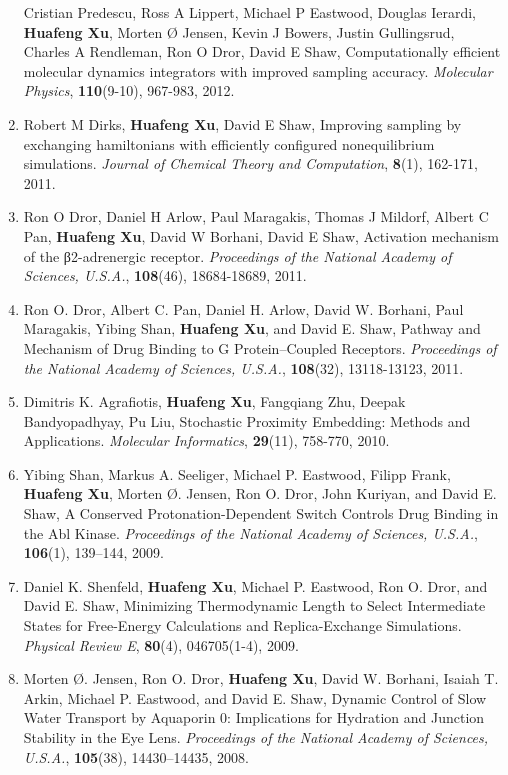 \documentclass[11pt]{article}
\begin{document}
\begin{enumerate}
Cristian Predescu, Ross A Lippert, Michael P Eastwood, Douglas Ierardi, \textbf{Huafeng Xu}, Morten Ø Jensen, Kevin J Bowers, Justin Gullingsrud, Charles A Rendleman, Ron O Dror, David E Shaw, Computationally efficient molecular dynamics integrators with improved sampling accuracy. \textit{Molecular Physics}, \textbf{110}(9-10), 967-983, 2012.
\item
Robert M Dirks, \textbf{Huafeng Xu}, David E Shaw, Improving sampling by exchanging hamiltonians with efficiently configured nonequilibrium simulations. \textit{Journal of Chemical Theory and Computation}, \textbf{8}(1), 162-171, 2011.
\item
Ron O Dror, Daniel H Arlow, Paul Maragakis, Thomas J Mildorf, Albert C Pan, \textbf{Huafeng Xu}, David W Borhani, David E Shaw, Activation mechanism of the β2-adrenergic receptor. \textit{Proceedings of the National Academy of Sciences, U.S.A.}, \textbf{108}(46), 18684-18689, 2011.
\item
Ron O. Dror, Albert C. Pan, Daniel H. Arlow, David W. Borhani, Paul Maragakis, Yibing Shan, \textbf{Huafeng Xu}, and David E. Shaw, Pathway and Mechanism of Drug Binding to G Protein–Coupled Receptors. \textit{Proceedings of the National Academy of Sciences, U.S.A.}, \textbf{108}(32), 13118-13123, 2011.
\item
Dimitris K. Agrafiotis, \textbf{Huafeng Xu}, Fangqiang Zhu, Deepak Bandyopadhyay, Pu Liu, Stochastic Proximity Embedding: Methods and Applications. \textit{Molecular Informatics}, \textbf{29}(11), 758-770, 2010.
\item
Yibing Shan, Markus A. Seeliger, Michael P. Eastwood, Filipp Frank, \textbf{Huafeng Xu}, Morten \O. Jensen, Ron O. Dror, John Kuriyan, and David E. Shaw, A Conserved Protonation-Dependent Switch Controls Drug Binding in the Abl Kinase. \textit{Proceedings of the National Academy of Sciences, U.S.A.}, \textbf{106}(1), 139–144, 2009.
\item
Daniel K. Shenfeld, \textbf{Huafeng Xu}, Michael P. Eastwood, Ron O. Dror, and David E. Shaw, Minimizing Thermodynamic Length to Select Intermediate States for Free-Energy Calculations and Replica-Exchange Simulations. \textit{Physical Review E}, \textbf{80}(4), 046705(1-4), 2009.
\item
Morten \O. Jensen, Ron O. Dror, \textbf{Huafeng Xu}, David W. Borhani, Isaiah T. Arkin, Michael P. Eastwood, and David E. Shaw, Dynamic Control of Slow Water Transport by Aquaporin 0: Implications for Hydration and Junction Stability in the Eye Lens. \textit{Proceedings of the National Academy of Sciences, U.S.A.}, \textbf{105}(38), 14430–14435, 2008.

\end{enumerate}
\end{document}
